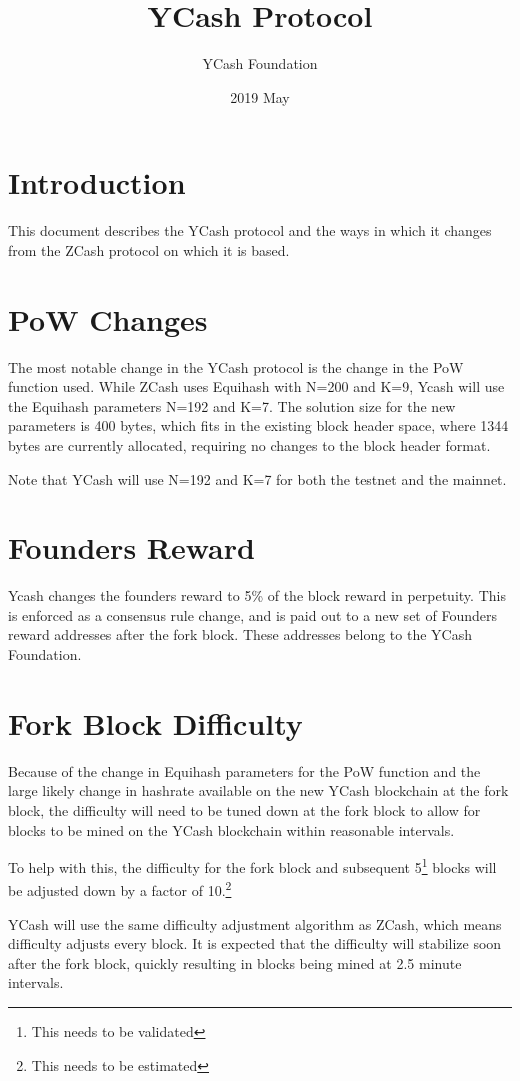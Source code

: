 \documentclass{article}
\title{YCash Protocol}
\date{2019 May}
\author{YCash Foundation}
\begin{document}
\maketitle

\section{Introduction}
This document describes the YCash protocol and the ways in which it changes from the ZCash protocol on which it is based. 

\section{PoW Changes}
The most notable change in the YCash protocol is the change in the PoW function used. While ZCash uses Equihash with N=200 and K=9, Ycash will use the Equihash parameters N=192 and K=7. The solution size for the new parameters is 400 bytes, which fits in the existing block header space, where 1344 bytes are currently allocated, requiring no changes to the block header format. 
\par 
Note that YCash will use N=192 and K=7 for both the testnet and the mainnet.

\section{Founders Reward}
Ycash changes the founders reward to 5\% of the block reward in perpetuity. This is enforced as a consensus rule change, and is paid out to a new set of Founders reward addresses after the fork block. These addresses belong to the YCash Foundation.

\section{Fork Block Difficulty}
Because of the change in Equihash parameters for the PoW function and the large likely change in hashrate available on the new YCash blockchain at the fork block, the difficulty will need to be tuned down at the fork block to allow for blocks to be mined on the YCash blockchain within reasonable intervals. 
\par
To help with this, the difficulty for the fork block and subsequent 5\footnote{This needs to be validated} blocks will be adjusted down by a factor of 10.\footnote{This needs to be estimated}
\par
YCash will use the same difficulty adjustment algorithm as ZCash, which means difficulty adjusts every block. It is expected that the difficulty will stabilize soon after the fork block, quickly resulting in blocks being mined at 2.5 minute intervals.
\end{document}
